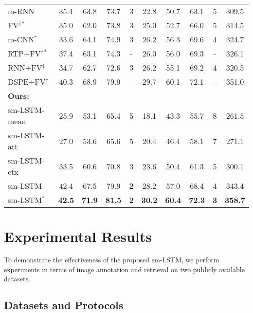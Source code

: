 \documentclass[10pt,twocolumn,letterpaper]{article}
\begin{document}
\begin{table*}[t]
\begin{tabular}{l|cccc|cccc|c}
m-RNN \cite{mao2014explain}       &35.4 &63.8 &73.7 &{3} &22.8 &50.7 &63.1 &{5} & 309.5\\
FV$^{\dag*}$ \cite{klein2015associating} &35.0 &62.0 &73.8 &{3} &25.0 &52.7 &66.0 &{5} & 314.5\\
m-CNN$^*$ \cite{ma2015multimodal}          &33.6 &{64.1} &{74.9} &{3} &{26.2} &{56.3} &{69.6} &{4} & 324.7\\
RTP+FV$^{\dag*}$  \cite{plummer2015flickr30k} &{37.4} &63.1 &74.3 &- &26.0 &{56.0} &{69.3} &- & 326.1\\
RNN+FV$^{\dag}$ \cite{lev2015rnn}          &34.7 &62.7 &72.6 &{3} &{26.2} &55.1 &69.2 &{4} & 320.5\\
DSPE+FV$^{\dag}$ \cite{wang2015learning}       &40.3 &68.9 &79.9 &- &29.7 &60.1 &72.1 &- & 351.0\\
\hline
\bf{Ours}:      & & & & & & & &\\
\hspace{0mm} sm-LSTM-mean                &25.9 &53.1 &65.4 &5 &18.1 &43.3 &55.7 &8 & 261.5\\
\hspace{0mm} sm-LSTM-att                &27.0 &53.6 &65.6 &5 &20.4 &46.4 &58.1 &7 & 271.1\\
\hspace{0mm} sm-LSTM-ctx                 &33.5 &60.6 &70.8 &3 &23.6 &50.4 &61.3 &5 &300.1\\
\hspace{0mm} sm-LSTM                  &42.4 &67.5 &79.9 &\bf{2} &28.2 &57.0 &68.4 &4 &343.4 \\
\hspace{0mm} sm-LSTM$^*$                 &\bf{42.5} &\bf{71.9} &\bf{81.5} &\bf{2} &\bf{30.2} &\bf{60.4} &\bf{72.3} &\bf{3} & \bf{358.7}\\




\hline
\hline
\end{tabular}

\label{table:f30k}
\end{table*}


\section{Experimental Results}
To demonstrate the effectiveness of the proposed sm-LSTM,
we perform experiments in terms of image annotation
and retrieval on two publicly available datasets.

\subsection{Datasets and Protocols}
\end{document}
